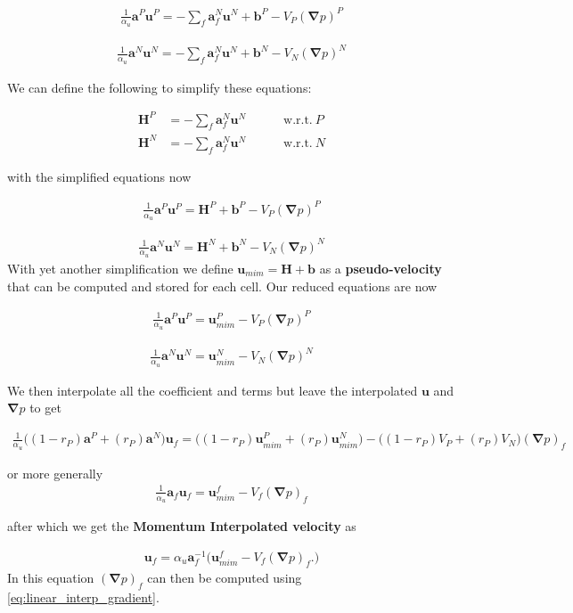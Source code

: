 \documentclass[11pt,letterpaper,titlepage]{article}
\newcommand{\beq}{\begin{equation*}
\begin{aligned}}
\newcommand{\eeq}{\end{aligned}
\end{equation*}}
\newcommand{\beqn}{\begin{equation}
	\begin{aligned}}
\newcommand{\eeqn}{\end{aligned}
	\end{equation}}
\newcommand{\bnabla}{\boldsymbol{\nabla}}
\newcommand{\bvel}{\mathbf{u}}
\numberwithin{equation}{section}
\begin{document}
\beq
\frac{1}{\alpha_u} \mathbf{a}^P \bvel^P  = 
- \sum_f \mathbf{a}_f^N \bvel^N +
\mathbf{b}^P 
-V_P (\bnabla p)^P
\eeq

\beq
\frac{1}{\alpha_u} \mathbf{a}^N \bvel^N  = 
- \sum_f \mathbf{a}_f^N \bvel^N +
\mathbf{b}^N
-V_N (\bnabla p)^N
\eeq

We can define the following to simplify these equations:

\beqn
\mathbf{H}^P &= -\sum_f \mathbf{a}_f^N \bvel^N \quad \quad \quad \text{w.r.t.}  \ P \\
\mathbf{H}^N &= -\sum_f \mathbf{a}_f^N \bvel^N \quad \quad \quad \text{w.r.t.}  \ N 
\eeqn

with the simplified equations now

\beq
\frac{1}{\alpha_u} \mathbf{a}^P \bvel^P  = 
\mathbf{H}^P +
\mathbf{b}^P
-V_P (\bnabla p)^P
\eeq

\beq
\frac{1}{\alpha_u} \mathbf{a}^N \bvel^N  = 
\mathbf{H}^N +
\mathbf{b}^N
-V_N (\bnabla p)^N
\eeq
\newline
With yet another simplification we define $\bvel_{mim} = \mathbf{H} + \mathbf{b}$ as a \textbf{pseudo-velocity} that can be computed and stored for each cell. Our reduced equations are now

\beq
\frac{1}{\alpha_u} \mathbf{a}^P \bvel^P  = \bvel_{mim}^P - V_P (\bnabla p)^P
\eeq

\beq
\frac{1}{\alpha_u} \mathbf{a}^N \bvel^N  = \bvel_{mim}^N - V_N (\bnabla p)^N
\eeq

We then interpolate all the coefficient and terms but leave the interpolated $\bvel$ and $\bnabla p$ to get

\beqn
\frac{1}{\alpha_u} \biggr(
(1-r_P)\mathbf{a}^P + (r_P)\mathbf{a}^N
\biggr ) \bvel_f  
= \biggr(
(1-r_P)\bvel_{mim}^P + (r_P)\bvel_{mim}^N
\biggr )
-\biggr(
(1-r_P)V_P + (r_P)V_N
\biggr ) (\bnabla p)_f
\eeqn 

or more generally
\beqn
\frac{1}{\alpha_u} \mathbf{a}_f \bvel_f  
= \bvel_{mim}^f
-V_f (\bnabla p)_f
\eeqn 

after which we get the \textbf{Momentum Interpolated velocity} as

\beqn \label{eq:MIM_velocity}
 \bvel_f  
= \alpha_u \mathbf{a}_f^{-1} \biggr(
\bvel_{mim}^f
-V_f (\bnabla p)_f.
\biggr)
\eeqn 
\newline
In this equation $(\bnabla p)_f$ can then be computed using \eqref{eq:linear_interp_gradient}.
\end{document}
